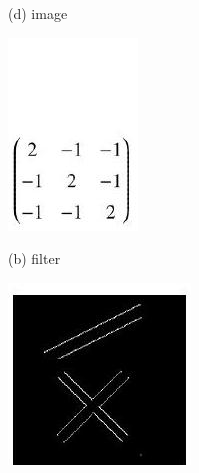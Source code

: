 \documentclass[10pt]{article}
\begin{document}
(d) image

\includegraphics[max width=\textwidth]{2022_01_06_b5ce182ed1bd5f482e5bg-11(4)}

(b) filter

\includegraphics[max width=\textwidth]{2022_01_06_b5ce182ed1bd5f482e5bg-11(5)}
\end{document}
